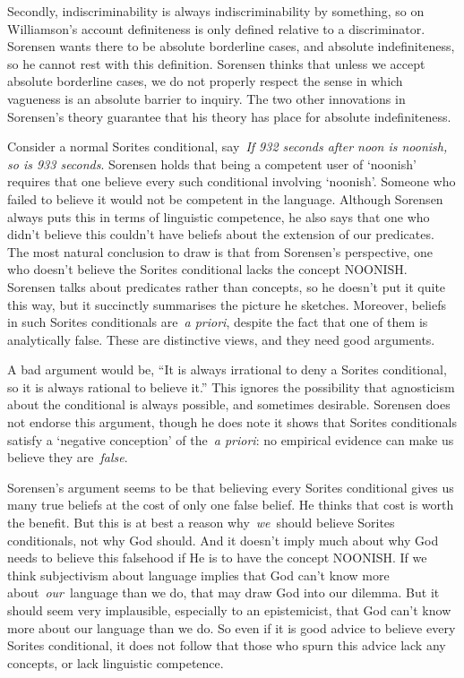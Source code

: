 \documentclass[
  11pt,
  letterpaper,
  DIV=11,
  numbers=noendperiod,
  twoside]{scrartcl}
\begin{document}
Secondly, indiscriminability is always indiscriminability by something,
so on Williamson's account definiteness is only defined relative to a
discriminator. Sorensen wants there to be absolute borderline cases, and
absolute indefiniteness, so he cannot rest with this definition.
Sorensen thinks that unless we accept absolute borderline cases, we do
not properly respect the sense in which vagueness is an absolute barrier
to inquiry. The two other innovations in Sorensen's theory guarantee
that his theory has place for absolute indefiniteness.

Consider a normal Sorites conditional, say~\emph{If 932 seconds after
noon is noonish, so is 933 seconds}. Sorensen holds that being a
competent user of `noonish' requires that one believe every such
conditional involving `noonish'. Someone who failed to believe it would
not be competent in the language. Although Sorensen always puts this in
terms of linguistic competence, he also says that one who didn't believe
this couldn't have beliefs about the extension of our predicates. The
most natural conclusion to draw is that from Sorensen's perspective, one
who doesn't believe the Sorites conditional lacks the concept NOONISH.
Sorensen talks about predicates rather than concepts, so he doesn't put
it quite this way, but it succinctly summarises the picture he sketches.
Moreover, beliefs in such Sorites conditionals are~\emph{a priori},
despite the fact that one of them is analytically false. These are
distinctive views, and they need good arguments.

A bad argument would be, ``It is always irrational to deny a Sorites
conditional, so it is always rational to believe it.'' This ignores the
possibility that agnosticism about the conditional is always possible,
and sometimes desirable. Sorensen does not endorse this argument, though
he does note it shows that Sorites conditionals satisfy a `negative
conception' of the~\emph{a priori}: no empirical evidence can make us
believe they are~\emph{false}.

Sorensen's argument seems to be that believing every Sorites conditional
gives us many true beliefs at the cost of only one false belief. He
thinks that cost is worth the benefit. But this is at best a reason
why~\emph{we}~should believe Sorites conditionals, not why God should.
And it doesn't imply much about why God needs to believe this falsehood
if He is to have the concept NOONISH. If we think subjectivism about
language implies that God can't know more about~\emph{our}~language than
we do, that may draw God into our dilemma. But it should seem very
implausible, especially to an epistemicist, that God can't know more
about our language than we do. So even if it is good advice to believe
every Sorites conditional, it does not follow that those who spurn this
advice lack any concepts, or lack linguistic competence.
\end{document}
